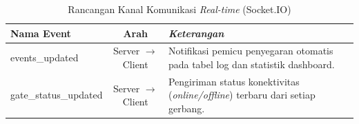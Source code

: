 \begin{table}[t]
    \centering
    \caption{Rancangan Kanal Komunikasi \textit{Real-time} (Socket.IO)}
    \label{tab:api_websocket}
    \begin{tabular}{|l|c|p{8cm}|}
        \hline
        \textbf{Nama Event} & \textbf{Arah} & \textit{Keterangan} \\
        \hline
        events\_updated & Server $\rightarrow$ Client & Notifikasi pemicu penyegaran otomatis pada tabel log dan statistik dashboard. \\
        \hline
        gate\_status\_updated & Server $\rightarrow$ Client & Pengiriman status konektivitas (\textit{online/offline}) terbaru dari setiap gerbang. \\
        \hline
    \end{tabular}
\end{table}